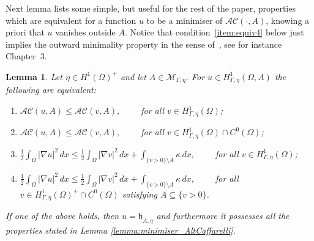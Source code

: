\documentclass[a4paper,11pt,reqno]{amsart}
\numberwithin{equation}{section}
\newtheorem{lemma}[teo]{Lemma}
\theoremstyle{definition}
\theoremstyle{remark}
\begin{document}
Next lemma lists some simple, but useful for the rest of the paper, properties which are equivalent for a function $u$ to be a minimiser of $\mathcal{AC}(\cdot, A)$, knowing a priori that $u$ vanishes outside $A$.
Notice that condition~\eqref{item:equiv4} below just implies the outward minimality property in the sense of~\cite{Velichkov}, see for instance Chapter~3.

\begin{lemma} \label{lemma:equivalent}
    Let $\eta\in H^1(\Omega)^+$ and let $A\in \mathcal M_{\Gamma,\eta}$. For $u \in H^1_{\Gamma,\eta}(\Omega,A)$ the following are equivalent:
    \begin{enumerate}
        \item $\mathcal{AC}(u,A)\le \mathcal{AC}(v,A),\qquad$ for all $v\in H^1_{\Gamma,\eta}(\Omega)$; \label{item:equiv1}
        \item $\mathcal{AC}(u,A)\le \mathcal{AC}(v,A),\qquad$ for all $v\in H^1_{\Gamma,\eta}(\Omega)\cap C^0(\Omega)$;\label{item:equiv2}

        \item $\displaystyle \frac 12\int_\Omega |\nabla u|^2 \, dx  \leq \frac 12\int_\Omega |\nabla v|^2 \, dx + \int_{\{v > 0\}\setminus A}\kappa\, dx,\qquad$ for all $v\in H^1_{\Gamma,\eta}(\Omega)$;\label{item:equiv3}
        \item $\displaystyle \frac 12\int_\Omega |\nabla u|^2 \, dx  \leq \frac 12\int_\Omega |\nabla v|^2 \, dx + \int_{\{v > 0\}\setminus A}\kappa\, dx,\qquad$ for all $v\in H^1_{\Gamma,\eta}(\Omega)^+\cap C^0(\Omega)$ satisfying $A\subseteq \{v>0\}$.\label{item:equiv4}
    \end{enumerate}
    If one of the above holds, then $u=\mathfrak{h}_{A,\eta}$ and furthermore it possesses all the properties stated in Lemma \ref{lemma:minimiser_AltCaffarelli}.
\end{lemma}
\end{document}
